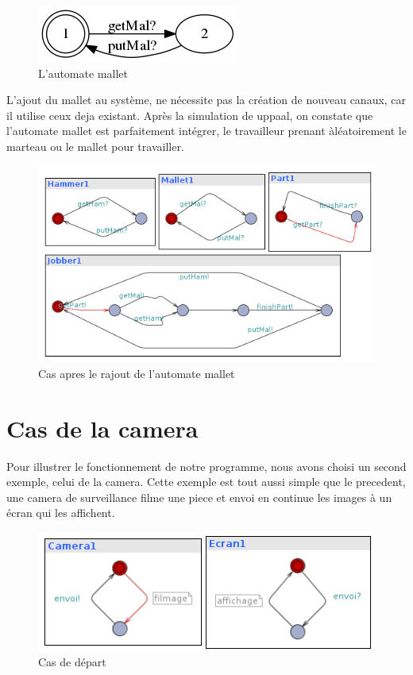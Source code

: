 \documentclass[12pt,a4paper]{report}
\begin{document}
\begin{figure}[h]
  \centering
  \includegraphics[scale=0.6]{ressources/mallet.png}
  \caption{L'automate mallet}
\end{figure}    

    L'ajout du mallet au système, ne nécessite pas la création de nouveau canaux, car il utilise ceux deja existant. Après la simulation de uppaal, on constate que l'automate mallet est parfaitement intégrer, le travailleur prenant àléatoirement le marteau ou le mallet pour travailler.

\begin{figure}[h]
  \centering
  \includegraphics[scale=0.6]{ressources/workerMallet.png}
  \caption{Cas apres le rajout de l'automate mallet}
\end{figure}  

\newpage    
    \section{Cas de la camera}

    Pour illustrer le fonctionnement de notre programme, nous avons choisi un second exemple, celui de la camera. Cette exemple est tout aussi simple que le precedent, une camera de surveillance filme une piece et envoi en continue les images à un écran qui les affichent.
    
\begin{figure}[h]
  \centering
  \includegraphics[scale=0.6]{ressources/cameraBasic.png}
  \caption{Cas de départ}
\end{figure}       
\end{document}
